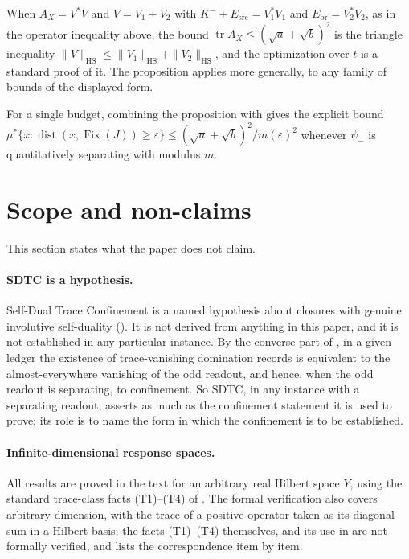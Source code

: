 \documentclass[11pt]{article}
\DeclareMathOperator{\Fix}{Fix}
\DeclareMathOperator{\dist}{dist}
\DeclareMathOperator{\trace}{tr}
\newcommand{\psim}{\psi_{-}}
\newcommand{\AX}{A_{X}}
\newcommand{\Kminus}{K^{-}}
\theoremstyle{definition}
\begin{document}
When \(\AX=V^*V\) and \(V=V_1+V_2\) with
\(\Kminus+E_{\mathrm{src}}=V_1^*V_1\) and \(E_{\mathrm{br}}=V_2^*V_2\),
as in the operator inequality above, the bound
\(\trace\AX\leq(\sqrt a+\sqrt b)^2\) is the triangle inequality
\(\|V\|_{\mathrm{HS}}\leq\|V_1\|_{\mathrm{HS}}+\|V_2\|_{\mathrm{HS}}\),
and the optimization over \(t\) is a standard proof of it.  The
proposition applies more generally, to any family of bounds of the
displayed form.

For a single budget, combining the proposition with
 gives the
explicit bound
\(\mu^*\{x:\dist(x,\Fix(J))\geq\varepsilon\}\leq
(\sqrt a+\sqrt b)^2/m(\varepsilon)^2\) whenever \(\psim\) is
quantitatively separating with modulus \(m\).
 \section{Scope and non-claims}
\label{sec:scope}

This section states what the paper does not claim.

\paragraph{SDTC is a hypothesis.}
Self-Dual Trace Confinement is a named hypothesis about closures with
genuine involutive self-duality ().  It is not
derived from anything in this paper, and it is not established in any
particular instance.  By the converse part of
, in a given ledger the
existence of trace-vanishing domination records is equivalent to the
almost-everywhere vanishing of the odd readout, and hence, when the
odd readout is separating, to confinement.  So SDTC, in any instance
with a separating readout, asserts as much as the confinement
statement it is used to prove; its role is to name the form in which the confinement is to be
established.

\paragraph{Infinite-dimensional response spaces.}
All results are proved in the text for an arbitrary real Hilbert space
\(Y\), using the standard trace-class facts (T1)--(T4) of
.  The formal verification also covers
arbitrary dimension, with the trace of a positive operator taken as its
diagonal sum in a Hilbert basis; the facts (T1)--(T4) themselves,
 and its use in
 are not formally verified, and
 lists the correspondence item by item.
\end{document}
